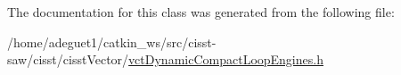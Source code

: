 The documentation for this class was generated from the following file\-:\begin{DoxyCompactItemize}
\item 
/home/adeguet1/catkin\-\_\-ws/src/cisst-\/saw/cisst/cisst\-Vector/\hyperlink{vct_dynamic_compact_loop_engines_8h}{vct\-Dynamic\-Compact\-Loop\-Engines.\-h}\end{DoxyCompactItemize}

